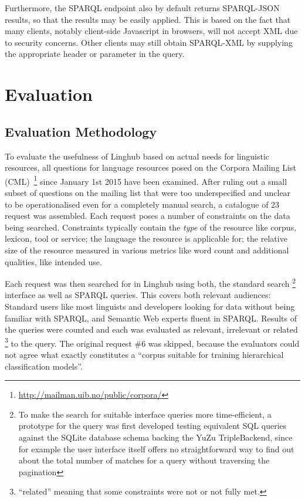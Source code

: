 \documentclass[smallextended]{svjour3}       %
\begin{document}
Furthermore, the SPARQL endpoint also by default returns SPARQL-JSON
results\cite{seaborne2013sparql}, so that the results may be easily applied. This is based on the
fact that many clients, notably client-side Javascript in browsers, will not
accept XML due to security concerns. Other clients may still obtain SPARQL-XML
by supplying the appropriate header or parameter in the query.

\section{Evaluation}
\label{evaluation}

\subsection{Evaluation Methodology}

To evaluate the usefulness of Linghub based on actual needs for linguistic 
resources, all questions for language resources posed on the Corpora Mailing 
List (CML)~\footnote{\url{http://mailman.uib.no/public/corpora/}} since January
1st 2015 have been examined. After ruling out a small subset of questions on the
mailing list that were too underspecified and unclear to be operationalised even
for a completely manual search, a catalogue of 23 request was assembled. Each
request poses a number of constraints on the data being searched. Constraints
typically contain the \emph{type} of the resource like corpus, lexicon, tool or
service; the language the resource is applicable for; the relative size of the
resource measured in various metrics like word count and additional qualities,
like intended use.  

Each request was then searched for in Linghub using both, the standard search
\footnote{To make the search for suitable interface queries more time-efficient,
    a prototype for the query was first developed testing equivalent SQL queries
    against the SQLite database schema backing the YuZu TripleBackend, since for
    example the user interface itself offers no straightforward way to find out
    about the total number of matches for a query without traversing the
pagination}
interface as well as SPARQL queries. This covers both relevant audiences:
Standard users like most linguists and developers looking for data without being
familiar with SPARQL, and Semantic Web experts fluent in SPARQL. Results of the
queries were counted and each was evaluated as relevant, irrelevant or related
\footnote{``related'' meaning that some constraints were not or not fully met.}
to the query. The original request \#6 was skipped, because the evaluators could
not agree what exactly constitutes a ``corpus suitable for training hierarchical
classification models''. 
\end{document}
